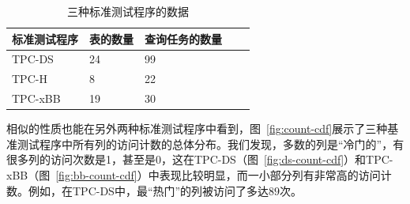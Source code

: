 \begin{table}[tbp]
    \centering
    \caption{三种标准测试程序的数据}
      \begin{tabularx}{.5\textwidth}{|l|X|X|X|r|}
      \hline
      \textbf{标准测试程序} & \textbf{表的数量} & \textbf{查询任务的数量}  \bigstrut\\ %
      \hline
      TPC-DS & 24  & 99 \bigstrut\\ %
      \hline
      TPC-H & 8  & 22 \bigstrut\\ %
      \hline
      TPC-xBB & 19  & 30 \bigstrut\\ %
      \hline
      \end{tabularx}%
    \label{tab:setup}
\end{table}


\par 相似的性质也能在另外两种标准测试程序中看到，图~\ref{fig:count-cdf}展示了三种基准测试程序中所有列的访问计数的总体分布。我们发现，多数的列是“冷门的”，有很多列的访问次数是1，甚至是0，这在TPC-DS（图~\ref{fig:ds-count-cdf}）和TPC-xBB（图~\ref{fig:bb-count-cdf}）中表现比较明显，而一小部分列有非常高的访问计数。例如，在TPC-DS中，最“热门”的列被访问了多达$89$次。


